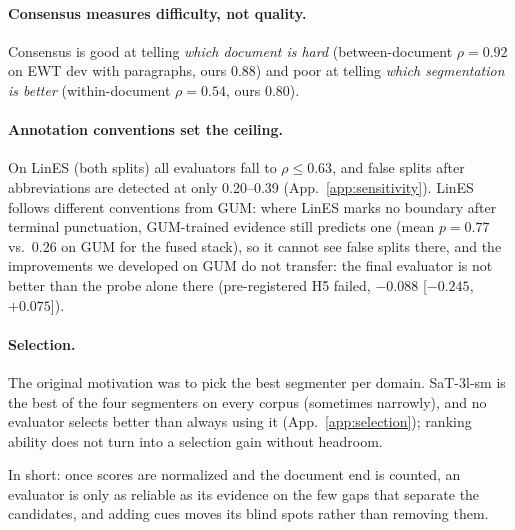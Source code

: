 \paragraph{Consensus measures difficulty, not quality.} Consensus is good at telling \emph{which document is hard}
(between-document $\rho = 0.92$ on EWT dev with paragraphs, ours 0.88) and poor at telling \emph{which segmentation is
better} (within-document $\rho = 0.54$, ours 0.80).

\paragraph{Annotation conventions set the ceiling.} On LinES (both splits) all evaluators fall to $\rho \le 0.63$, and
false splits after abbreviations are detected at only 0.20--0.39 (App.~\ref{app:sensitivity}). LinES follows
different conventions from GUM: where LinES marks no boundary after terminal punctuation, GUM-trained evidence still
predicts one (mean $p = 0.77$ vs.\ 0.26 on GUM for the fused stack), so it cannot see false splits there, and the
improvements we developed on GUM do not transfer: the final evaluator is not better than the probe alone there
(pre-registered H5 failed, $-0.088$ [$-0.245$, $+0.075$]).

\paragraph{Selection.} The original motivation was to pick the best segmenter per domain. SaT-3l-sm is the best of the
four segmenters on every corpus (sometimes narrowly), and no evaluator selects better than always using it
(App.~\ref{app:selection}); ranking ability does not turn into a selection gain without headroom.

In short: once scores are normalized and the document end is counted, an evaluator is only as reliable as its evidence on
the few gaps that separate the candidates, and adding cues moves its blind spots rather than removing them.

